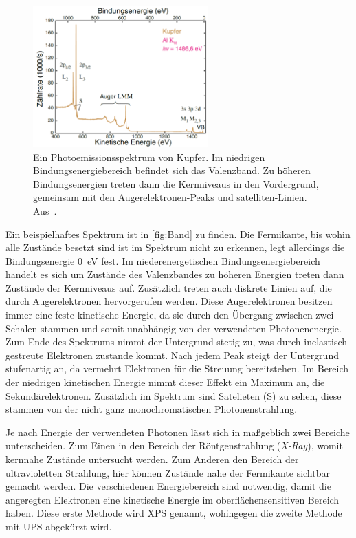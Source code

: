        \begin{figure}
            \centering
            \includegraphics[width=0.6\textwidth]{Band}
            \caption{Ein Photoemissionsspektrum von Kupfer.
            Im niedrigen Bindungsenergiebereich befindet sich das Valenzband. 
            Zu höheren Bindungsenergien treten dann die Kernniveaus in den Vordergrund, gemeinsam mit den Augerelektronen-Peaks und satelliten-Linien.
            Aus~\cite{Fauster}.}
            \label{fig:Band}
        \end{figure}
        Ein beispielhaftes Spektrum ist in \autoref{fig:Band} zu finden.
        Die Fermikante, bis wohin alle Zustände besetzt sind ist im Spektrum nicht zu erkennen, legt allerdings die Bindungsenergie \SI{0}{\electronvolt} fest.
        Im niederenergetischen Bindungsenergiebereich handelt es sich um Zustände des Valenzbandes zu höheren Energien treten dann Zustände der Kernniveaus auf.
        Zusätzlich treten auch diskrete Linien auf, die durch Augerelektronen hervorgerufen werden.
        Diese Augerelektronen besitzen immer eine feste kinetische Energie, da sie durch den Übergang zwischen zwei Schalen stammen und somit unabhängig von der verwendeten Photonenenergie.
        Zum Ende des Spektrums nimmt der Untergrund stetig zu, was durch inelastisch gestreute Elektronen zustande kommt.
        Nach jedem Peak steigt der Untergrund stufenartig an, da vermehrt Elektronen für die Streuung bereitstehen.
        Im Bereich der niedrigen kinetischen Energie nimmt dieser Effekt ein Maximum an, die Sekundärelektronen.
        Zusätzlich im Spektrum sind Satelieten (S) zu sehen, diese stammen von der nicht ganz monochromatischen Photonenstrahlung. %

        Je nach Energie der verwendeten Photonen lässt sich in maßgeblich zwei Bereiche unterscheiden.
        Zum Einen in den Bereich der Röntgenstrahlung (\textit{X-Ray}), womit kernnahe Zustände untersucht werden.
        Zum Anderen den Bereich der ultravioletten Strahlung, hier können Zustände nahe der Fermikante sichtbar gemacht werden.
        Die verschiedenen Energiebereich sind notwendig, damit die angeregten Elektronen eine kinetische Energie im oberflächensensitiven Bereich haben.
        Diese erste Methode wird XPS genannt, wohingegen die zweite Methode mit UPS abgekürzt wird.

